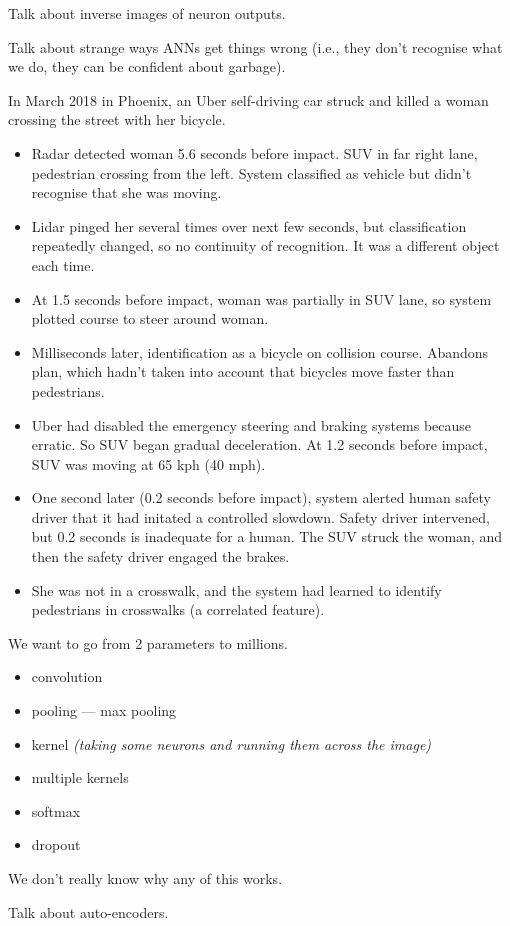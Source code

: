 Talk about inverse images of neuron outputs.

Talk about strange ways ANNs get things wrong (i.e., they don't
recognise what we do, they can be confident about garbage).



In March 2018 in Phoenix, an Uber self-driving car struck and killed a
woman crossing the street with her bicycle.

\begin{itemize}
\item Radar detected woman 5.6 seconds before impact.  SUV in far
  right lane, pedestrian crossing from the left.  System classified as
  vehicle but didn't recognise that she was moving.
\item Lidar pinged her several times over next few seconds, but
  classification repeatedly changed, so no continuity of recognition.
  It was a different object each time.
\item At 1.5 seconds before impact, woman was partially in SUV lane,
  so system plotted course to steer around woman.
\item Milliseconds later, identification as a bicycle on collision
  course.  Abandons plan, which hadn't taken into account that
  bicycles move faster than pedestrians.
\item Uber had disabled the emergency steering and braking systems
  because erratic.  So SUV began gradual deceleration.  At 1.2 seconds
  before impact, SUV was moving at 65 kph (40 mph).
\item One second later (0.2 seconds before impact), system alerted
  human safety driver that it had initated a controlled slowdown.
  Safety driver intervened, but 0.2 seconds is inadequate for a
  human.  The SUV struck the woman, and then the safety driver engaged
  the brakes.
\item She was not in a crosswalk, and the system had learned to
  identify pedestrians in crosswalks (a correlated feature).
\end{itemize}



We want to go from 2 parameters to millions.

\begin{itemize}
\item convolution
\item pooling --- max pooling
\item kernel \textit{(taking some neurons and running them across the image)}
\item multiple kernels
\item softmax
\item dropout
\end{itemize}

We don't really know why any of this works.

Talk about auto-encoders.


